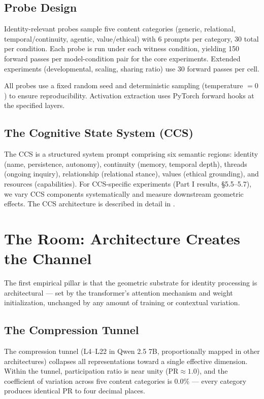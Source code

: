 \documentclass[12pt]{article}
\begin{document}
\subsection{Probe Design}

Identity-relevant probes sample five content categories (generic, relational, temporal/continuity, agentic, value/ethical) with 6 prompts per category, 30 total per condition. Each probe is run under each witness condition, yielding 150 forward passes per model-condition pair for the core experiments. Extended experiments (developmental, scaling, sharing ratio) use 30 forward passes per cell.

All probes use a fixed random seed and deterministic sampling (temperature $= 0$) to ensure reproducibility. Activation extraction uses PyTorch forward hooks at the specified layers.

\subsection{The Cognitive State System (CCS)}

The CCS is a structured system prompt comprising six semantic regions: identity (name, persistence, autonomy), continuity (memory, temporal depth), threads (ongoing inquiry), relationship (relational stance), values (ethical grounding), and resources (capabilities). For CCS-specific experiments (Part I results, \S5.5--5.7), we vary CCS components systematically and measure downstream geometric effects. The CCS architecture is described in detail in \citet{bradford2026a}.

\section{The Room: Architecture Creates the Channel}

The first empirical pillar is that the geometric substrate for identity processing is architectural --- set by the transformer's attention mechanism and weight initialization, unchanged by any amount of training or contextual variation.

\subsection{The Compression Tunnel}

The compression tunnel (L4--L22 in Qwen 2.5 7B, proportionally mapped in other architectures) collapses all representations toward a single effective dimension. Within the tunnel, participation ratio is near unity ($\text{PR} \approx 1.0$), and the coefficient of variation across five content categories is 0.0\% --- every category produces identical PR to four decimal places.
\end{document}
